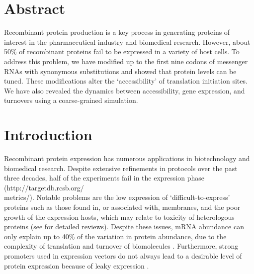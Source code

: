 \section{Abstract}
Recombinant protein production is a key process in generating proteins of interest in the pharmaceutical industry and biomedical research. However, about 50\% of recombinant proteins fail to be expressed in a variety of host cells. To address this problem, we have modified up to the first nine codons of messenger RNAs with synonymous substitutions and showed that protein levels can be tuned. These modifications alter the ‘accessibility’ of translation initiation sites. We have also revealed the dynamics between accessibility, gene expression, and turnovers using a coarse-grained simulation.

\section{Introduction}
Recombinant protein expression has numerous applications in biotechnology and biomedical research. Despite extensive refinements in protocols over the past three decades, half of the experiments fail in the expression phase (http://targetdb.rcsb.org/\\metrics/). Notable problems are the low expression of ‘difficult-to-express’ proteins such as those found in, or associated with, membranes, and the poor growth of the expression hosts, which may relate to toxicity of heterologous proteins \cite{Kimelman2012-cu} (see \cite{Berlec2013-mb,Rosano2014-oq} for detailed reviews). Despite these issues, mRNA abundance can only explain up to 40\% of the variation in protein abundance, due to the complexity of translation and turnover of biomolecules \cite{Abreu2009-zf,Hanson2018-ge,Lim2018-rq,Stevens2013-hu,Schwanhausser2011-po,Bernstein2002-gg,Taniguchi2010-uq}. Furthermore, strong promoters used in expression vectors do not always lead to a desirable level of protein expression because of leaky expression \cite{Rosano2014-oq}.

